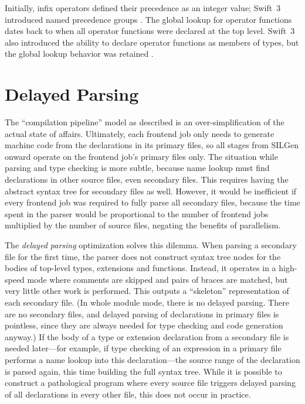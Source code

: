 \documentclass[../generics]{subfiles}
\begin{document}
Initially, infix operators defined their precedence as an integer value; Swift~3 introduced named precedence groups \cite{se0077}. The global lookup for operator functions dates back to when all operator functions were declared at the top level. Swift~3 also introduced the ability to declare operator functions as members of types, but the global lookup behavior was retained \cite{se0091}.

\section{Delayed Parsing}\label{delayed parsing}

The ``compilation pipeline'' model as described is an over-simplification of the actual state of affairs. Ultimately, each frontend job only needs to generate machine code from the declarations in its primary files, so all stages from SILGen onward operate on the frontend job's primary files only. The situation while parsing and type checking is more subtle, because name lookup must find declarations in other source files, even secondary files. This requires having the abstract syntax tree for secondary files as well. However, it would be inefficient if every frontend job was required to fully parse all secondary files, because the time spent in the parser would be proportional to the number of frontend jobs multiplied by the number of source files, negating the benefits of parallelism.

The \emph{delayed parsing} optimization solves this dilemma. When parsing a secondary file for the first time, the parser does not construct syntax tree nodes for the bodies of top-level types, extensions and functions. Instead, it operates in a high-speed mode where comments are skipped and pairs of braces are matched, but very little other work is performed. This outputs a ``skeleton'' representation of each secondary file. (In whole module mode, there is no delayed parsing. There are no secondary files, and delayed parsing of declarations in primary files is pointless, since they are always needed for type checking and code generation anyway.) If the body of a type or extension declaration from a secondary file is needed later---for example, if type checking of an expression in a primary file performs a name lookup into this declaration---the source range of the declaration is parsed again, this time building the full syntax tree. While it is possible to construct a pathological program where every source file triggers delayed parsing of all declarations in every other file, this does not occur in practice.
\end{document}
